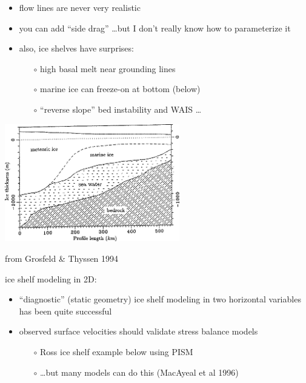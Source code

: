 \documentclass[titlepage,letterpaper,final,12pt]{scrartcl}
\begin{document}
\begin{itemize}
\item flow lines are never very realistic
\item you can add ``side drag'' \dots but I don't really know how to parameterize it
\item also, ice shelves have surprises:
  \begin{itemize}
  \item[$\circ$] high basal melt near grounding lines
  \item[$\circ$] marine ice can freeze-on at bottom (below)
  \item[$\circ$] ``reverse slope'' bed instability and WAIS \dots
  \end{itemize}
\end{itemize}

\medskip
\begin{center}
  \includegraphics[width=3.0in]{marineice}
  
from Grosfeld \& Thyssen 1994 \nocite{GrosfeldThyssen1994}
\end{center}

ice shelf modeling in 2D:

\begin{itemize}
\item ``diagnostic'' (static geometry) ice shelf modeling in two horizontal variables has been quite successful
\item observed surface velocities should validate stress balance models
  \begin{itemize}
  \item[$\circ$] Ross ice shelf example below using PISM
  \item[$\circ$] \dots but many models can do this (MacAyeal et al 1996\nocite{MacAyealetal})
  \end{itemize}
\end{itemize}
\end{document}
